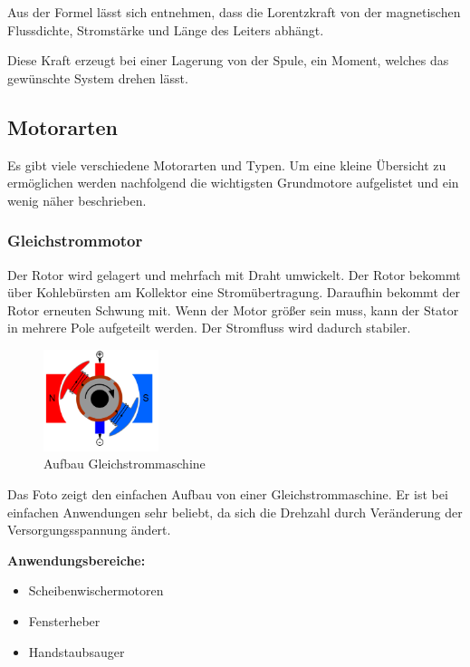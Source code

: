 \documentclass[12pt]{scrreprt} %
\begin{document}
Aus der Formel lässt sich entnehmen, dass die Lorentzkraft von der magnetischen Flussdichte, Stromstärke und Länge des Leiters abhängt.

Diese Kraft erzeugt bei einer Lagerung von der Spule, ein Moment, welches das gewünschte System drehen lässt.

\subsection{Motorarten}
\label{sec:motorarten}

Es gibt viele verschiedene Motorarten und Typen. Um eine kleine Übersicht zu ermöglichen werden nachfolgend die wichtigsten Grundmotore aufgelistet und ein wenig näher beschrieben.

\subsubsection{Gleichstrommotor}
\label{sec:gleichstrommotor}

Der Rotor wird gelagert und mehrfach mit Draht umwickelt. Der Rotor bekommt über Kohlebürsten am Kollektor eine Stromübertragung. Daraufhin bekommt der Rotor erneuten Schwung mit.
Wenn der Motor größer sein muss, kann der Stator in mehrere Pole aufgeteilt werden. Der Stromfluss wird dadurch stabiler.

\begin{figure}[!ht]
\begin{center}
	\caption{Aufbau Gleichstrommaschine}
	\includegraphics[width=0.3\textwidth]{Gleichstommaschine}
\end{center}
\end{figure}

Das Foto zeigt den einfachen Aufbau von einer Gleichstrommaschine. Er ist bei einfachen Anwendungen sehr beliebt, da sich die Drehzahl durch Veränderung der Versorgungsspannung ändert.\newline

\textbf{Anwendungsbereiche:}

\begin{itemize}
	\item{Scheibenwischermotoren}
	\item{Fensterheber}
	\item{Handstaubsauger}
\end{itemize}
\end{document}
